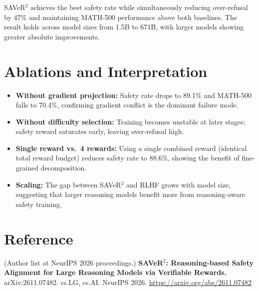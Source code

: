 \documentclass[10pt,twocolumn]{article}
\begin{document}
SAVeR$^2$ achieves the best safety rate while simultaneously reducing over-refusal by 47\% and maintaining MATH-500 performance above both baselines.
The result holds across model sizes from 1.5B to 671B, with larger models showing greater absolute improvements.

\section{Ablations and Interpretation}

\begin{itemize}[leftmargin=1em,itemsep=2pt]
  \item \textbf{Without gradient projection:} Safety rate drops to 89.1\% and MATH-500 falls to 70.4\%, confirming gradient conflict is the dominant failure mode.
  \item \textbf{Without difficulty selection:} Training becomes unstable at later stages; safety reward saturates early, leaving over-refusal high.
  \item \textbf{Single reward vs.\ 4 rewards:} Using a single combined reward (identical total reward budget) reduces safety rate to 88.6\%, showing the benefit of fine-grained decomposition.
  \item \textbf{Scaling:} The gap between SAVeR$^2$ and RLHF grows with model size, suggesting that larger reasoning models benefit more from reasoning-aware safety training.
\end{itemize}

\section*{Reference}
(Author list at NeurIPS 2026 proceedings.)
\textbf{SAVeR$^2$: Reasoning-based Safety Alignment for Large Reasoning Models via Verifiable Rewards.}
arXiv:2611.07482. cs.LG, cs.AI. NeurIPS 2026.
\url{https://arxiv.org/abs/2611.07482}
\end{document}
